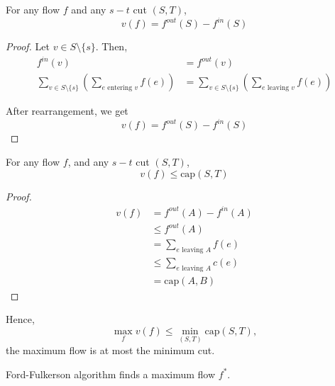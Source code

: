 \begin{theorem}
    For any flow $f$ and any $s-t$ cut $(S, T)$, \[
        v(f) = f^{out}(S) - f^{in}(S)
    \]
\end{theorem}

\begin{proof}
    Let $v \in S \setminus \{s\}$. Then,
    \begin{align*}
        f^{in}(v)
         & = f^{out}(v)                                                                     \\
        \sum_{v \in S \setminus \{s\}} \left( \sum_{e \text{ entering } v} f(e) \right)
         & = \sum_{v \in S \setminus \{s\}} \left( \sum_{e \text{ leaving } v} f(e) \right)
    \end{align*}

    After rearrangement, we get \[
        v(f) = f^{out}(S) - f^{in}(S)
    \]
\end{proof}

\begin{theorem}
    For any flow $f$, and any $s-t$ cut $(S, T)$, \[
        v(f) \le \text{cap}(S, T)
    \]
\end{theorem}

\begin{proof}
    \begin{align*}
        v(f) & = f^{out}(A) - f^{in}(A)             \\
             & \le f^{out}(A)                       \\
             & = \sum_{e \text{ leaving } A} f(e)   \\
             & \le \sum_{e \text{ leaving } A} c(e) \\
             & = \text{cap}(A, B)
    \end{align*}
\end{proof}

Hence, \[
    \max_{f} v(f) \le \min_{(S, T)} \text{cap}(S, T),
\] the maximum flow is at most the minimum cut.

\begin{theorem}
    Ford-Fulkerson algorithm finds a maximum flow $f^*$.
\end{theorem}

